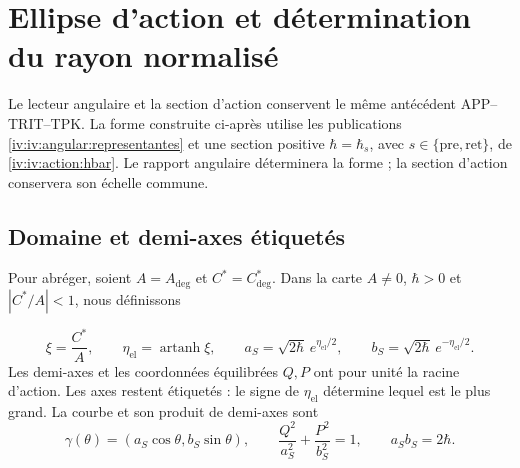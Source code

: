 \section{Ellipse d’action et détermination du rayon normalisé}
\label{iv:iv:ellipse:section}

Le lecteur angulaire et la section d’action conservent le même
antécédent APP--TRIT--TPK. La forme construite
ci-après utilise les publications
\eqref{iv:iv:angular:representantes} et une section positive
\(\hbar=\hbar_s\), avec
\(s\in\{\mathrm{pre},\mathrm{ret}\}\), de
\eqref{iv:iv:action:hbar}. Le rapport angulaire déterminera la forme ;
la section d’action conservera son échelle commune.

\subsection{Domaine et demi-axes étiquetés}
\label{iv:iv:ellipse:dominio}

Pour abréger, soient \(A=A_{\deg}\) et \(C^*=C^*_{\deg}\).
Dans la carte \(A\ne0\), \(\hbar>0\) et \(|C^*/A|<1\),
nous définissons

\begin{equation}
 \xi=\frac{C^*}{A},\qquad
 \eta_{\mathrm{el}}=\operatorname{artanh}\xi,\qquad
 a_S=\sqrt{2\hbar}\,e^{\eta_{\mathrm{el}}/2},\qquad
 b_S=\sqrt{2\hbar}\,e^{-\eta_{\mathrm{el}}/2}.
 \label{iv:iv:ellipse:semiejes}
\end{equation}
Les demi-axes et les coordonnées équilibrées \(Q,P\) ont pour
unité la racine d’action. Les axes restent étiquetés :
le signe de \(\eta_{\mathrm{el}}\) détermine lequel est le
plus grand. La courbe et son produit de demi-axes sont
\begin{equation}
 \gamma(\theta)=(a_S\cos\theta,b_S\sin\theta),\qquad
 \frac{Q^2}{a_S^2}+\frac{P^2}{b_S^2}=1,\qquad
 a_Sb_S=2\hbar.
 \label{iv:iv:ellipse:curva}
\end{equation}

